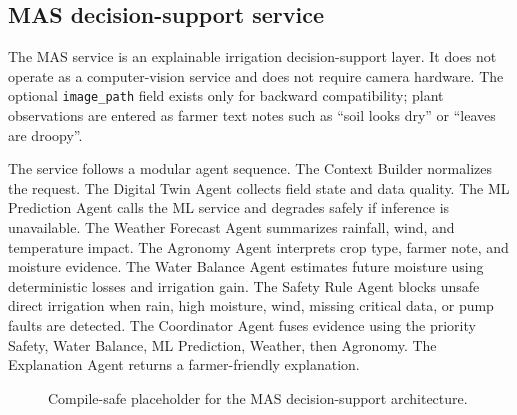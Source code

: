 \subsection{MAS decision-support service}

The MAS service is an explainable irrigation decision-support layer. It does not operate as a computer-vision service and does not require camera hardware. The optional \texttt{image\_path} field exists only for backward compatibility; plant observations are entered as farmer text notes such as ``soil looks dry'' or ``leaves are droopy''.

The service follows a modular agent sequence. The Context Builder normalizes the request. The Digital Twin Agent collects field state and data quality. The ML Prediction Agent calls the ML service and degrades safely if inference is unavailable. The Weather Forecast Agent summarizes rainfall, wind, and temperature impact. The Agronomy Agent interprets crop type, farmer note, and moisture evidence. The Water Balance Agent estimates future moisture using deterministic losses and irrigation gain. The Safety Rule Agent blocks unsafe direct irrigation when rain, high moisture, wind, missing critical data, or pump faults are detected. The Coordinator Agent fuses evidence using the priority Safety, Water Balance, ML Prediction, Weather, then Agronomy. The Explanation Agent returns a farmer-friendly explanation.

\begin{figure}[H]
    \centering
    \caption{Compile-safe placeholder for the MAS decision-support architecture.}
    \label{fig:mas_architecture_placeholder}
\end{figure}

